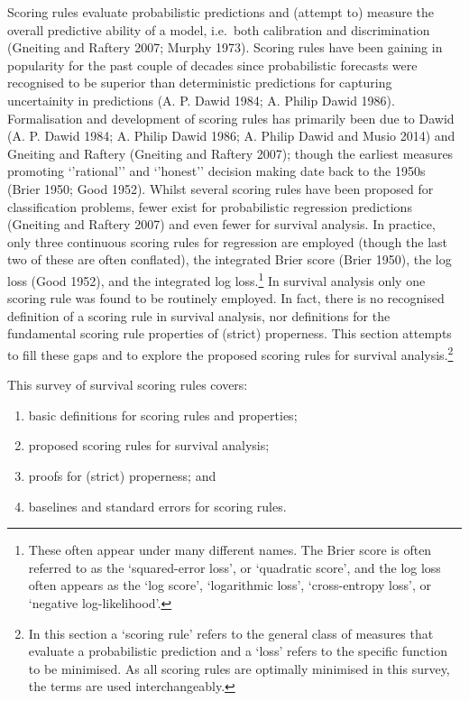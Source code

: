 \documentclass[
  letterpaper,
]{scrbook}
\providecommand{\tightlist}{%
  \setlength{\itemsep}{0pt}\setlength{\parskip}{0pt}}\usepackage{longtable,booktabs,array}
\theoremstyle{plain}
\theoremstyle{definition}
\theoremstyle{remark}
\begin{document}
Scoring rules evaluate probabilistic predictions and (attempt to)
measure the overall predictive ability of a model, i.e.~both calibration
and discrimination (Gneiting and Raftery 2007; Murphy 1973). Scoring
rules have been gaining in popularity for the past couple of decades
since probabilistic forecasts were recognised to be superior than
deterministic predictions for capturing uncertainity in predictions (A.
P. Dawid 1984; A. Philip Dawid 1986). Formalisation and development of
scoring rules has primarily been due to Dawid (A. P. Dawid 1984; A.
Philip Dawid 1986; A. Philip Dawid and Musio 2014) and Gneiting and
Raftery (Gneiting and Raftery 2007); though the earliest measures
promoting `'rational'' and `'honest'' decision making date back to the
1950s (Brier 1950; Good 1952). Whilst several scoring rules have been
proposed for classification problems, fewer exist for probabilistic
regression predictions (Gneiting and Raftery 2007) and even fewer for
survival analysis. In practice, only three continuous scoring rules for
regression are employed (though the last two of these are often
conflated), the integrated Brier score (Brier 1950), the log loss (Good
1952), and the integrated log loss.\footnote{These often appear under
  many different names. The Brier score is often referred to as the
  `squared-error loss', or `quadratic score', and the log loss often
  appears as the `log score', `logarithmic loss', `cross-entropy loss',
  or `negative log-likelihood'.} In survival analysis only one scoring
rule was found to be routinely employed. In fact, there is no recognised
definition of a scoring rule in survival analysis, nor definitions for
the fundamental scoring rule properties of (strict) properness. This
section attempts to fill these gaps and to explore the proposed scoring
rules for survival analysis.\footnote{In this section a `scoring rule'
  refers to the general class of measures that evaluate a probabilistic
  prediction and a `loss' refers to the specific function to be
  minimised. As all scoring rules are optimally minimised in this
  survey, the terms are used interchangeably.}

This survey of survival scoring rules covers:

\begin{enumerate}
\def\labelenumi{\roman{enumi}.}
\tightlist
\item
  basic definitions for scoring rules and properties;
\item
  proposed scoring rules for survival analysis;
\item
  proofs for (strict) properness; and
\item
  baselines and standard errors for scoring rules.
\end{enumerate}
\end{document}
